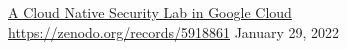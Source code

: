 \vspace*{5pt}
\begin{zitemize}
	\item   \href{https://zenodo.org/records/5918861}{A Cloud Native Security Lab in Google Cloud https://zenodo.org/records/5918861} \hfill January 29, 2022
\end{zitemize}
